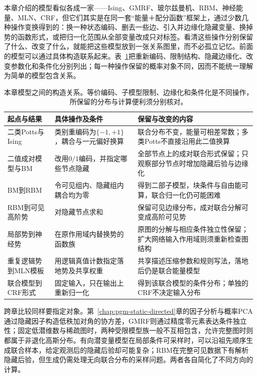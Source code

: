 本章介绍的模型看似各成一家——Ising、GMRF、玻尔兹曼机、RBM、神经能量、MLN、CRF，但它们其实是在同一套“能量＋配分函数”框架上，通过少数几种操作变换得到的：换一种状态编码、删去一些边、引入并边缘化隐藏变量、换掉势的函数形式，或把归一化范围从全部变量改成只对标签。看清这些操作分别保留了什么、改变了什么，就能把这些模型放到一张关系图里，而不必孤立记忆。前面的模型可以通过具体构造联系起来。表~\ref{tab:pgm-energy-models-relations}把重新编码、限制结构、隐藏边缘化、改变参数化和条件化分别列出；每一种操作保留的概率对象不同，因而不能统一理解为简单的模型包含关系。

\begin{table}[htbp]
  \centering
  \small
  \begin{tabularx}{\linewidth}{p{28mm}p{46mm}X}
    \toprule
    起点与结果 & 具体操作及条件 & 保留与改变的内容\\
    \midrule
    二类Potts与Ising & 类别重编码为$\{-1,+1\}$，耦合与一元偏好换算 & 联合分布不变，能量可相差常数；多类Potts不直接沿用此二值换算\\
    二值成对模型与BM & 改用$0/1$编码，并指定哪些节点隐藏 & 全部节点上的成对联合形式保留；只观察部分节点时增加隐藏后验与边缘化\\
    BM到RBM & 令可见组内、隐藏组内耦合均为零 & 得到二部子模型，块条件与自由能可算，联合归一化仍可能困难\\
    RBM到可见高阶势 & 对隐藏节点求和 & 保留可见边缘分布，成对联合分解可变成高阶可见势\\
    局部势到神经势 & 在原作用域内替换势的函数族 & 原图的分解与相应条件独立性保留；扩大网络输入作用域则须重新检查图结构\\
    重复逻辑势到MLN模板 & 用逻辑真值计数指定落地势及共享权重 & 共享描述压缩参数和规则写法，落地后仍是联合能量模型\\
    联合模型到CRF形式 & 固定输入，只在输出上重新归一化 & 得到该联合模型的条件分布；单独的CRF不决定输入分布\\
    \bottomrule
  \end{tabularx}
  \caption{本章模型之间的构造关系。等价编码、子模型限制、边缘化和条件化是不同操作，所保留的分布与计算便利须分别核对。}
  \label{tab:pgm-energy-models-relations}
\end{table}

跨章比较同样要指定对象。第~\ref{chap:pgm-static-directed}章的因子分析与概率PCA通过隐藏因子构造低秩加对角的协方差，GMRF则通过精度零元素表达条件独立性；固定低潜维数与稀疏图时，两种受限模型族一般不互相包含，允许完整图时则都属于非退化高斯分布。有向潜变量模型在局部条件可采样时，可以沿祖先顺序生成联合样本，给定观测后的隐藏后验却可能复杂；RBM在完整可见数据下有解析隐藏后验，但生成仍需处理无向联合分布的采样问题。两者各自简化了不同方向的计算。

